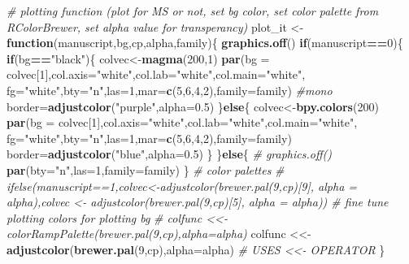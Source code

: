 \documentclass[10,portrait]{article}
\newenvironment{Shaded}{\begin{snugshade}}{\end{snugshade}}
\newcommand{\KeywordTok}[1]{\textcolor[rgb]{0.13,0.29,0.53}{\textbf{#1}}}
\newcommand{\DataTypeTok}[1]{\textcolor[rgb]{0.13,0.29,0.53}{#1}}
\newcommand{\DecValTok}[1]{\textcolor[rgb]{0.00,0.00,0.81}{#1}}
\newcommand{\FloatTok}[1]{\textcolor[rgb]{0.00,0.00,0.81}{#1}}
\newcommand{\StringTok}[1]{\textcolor[rgb]{0.31,0.60,0.02}{#1}}
\newcommand{\CommentTok}[1]{\textcolor[rgb]{0.56,0.35,0.01}{\textit{#1}}}
\newcommand{\ControlFlowTok}[1]{\textcolor[rgb]{0.13,0.29,0.53}{\textbf{#1}}}
\newcommand{\OperatorTok}[1]{\textcolor[rgb]{0.81,0.36,0.00}{\textbf{#1}}}
\newcommand{\NormalTok}[1]{#1}
\begin{document}
\begin{Shaded}
\begin{Highlighting}[]
\CommentTok{# plotting function (plot for MS or not, set bg color, set color palette from RColorBrewer, set alpha value for transperancy) }
\NormalTok{plot_it <-}\StringTok{ }\ControlFlowTok{function}\NormalTok{(manuscript,bg,cp,alpha,family)\{ }
  \KeywordTok{graphics.off}\NormalTok{()}
  \ControlFlowTok{if}\NormalTok{(manuscript}\OperatorTok{==}\DecValTok{0}\NormalTok{)\{}
    \ControlFlowTok{if}\NormalTok{(bg}\OperatorTok{==}\StringTok{"black"}\NormalTok{)\{}
\NormalTok{      colvec<-}\KeywordTok{magma}\NormalTok{(}\DecValTok{200}\NormalTok{,}\DecValTok{1}\NormalTok{)}
      \KeywordTok{par}\NormalTok{(}\DataTypeTok{bg =}\NormalTok{ colvec[}\DecValTok{1}\NormalTok{],}\DataTypeTok{col.axis=}\StringTok{"white"}\NormalTok{,}\DataTypeTok{col.lab=}\StringTok{"white"}\NormalTok{,}\DataTypeTok{col.main=}\StringTok{"white"}\NormalTok{,}
          \DataTypeTok{fg=}\StringTok{"white"}\NormalTok{,}\DataTypeTok{bty=}\StringTok{"n"}\NormalTok{,}\DataTypeTok{las=}\DecValTok{1}\NormalTok{,}\DataTypeTok{mar=}\KeywordTok{c}\NormalTok{(}\DecValTok{5}\NormalTok{,}\DecValTok{6}\NormalTok{,}\DecValTok{4}\NormalTok{,}\DecValTok{2}\NormalTok{),}\DataTypeTok{family=}\NormalTok{family) }\CommentTok{#mono}
\NormalTok{      border=}\KeywordTok{adjustcolor}\NormalTok{(}\StringTok{"purple"}\NormalTok{,}\DataTypeTok{alpha=}\FloatTok{0.5}\NormalTok{)}
\NormalTok{    \}}\ControlFlowTok{else}\NormalTok{\{}
\NormalTok{      colvec<-}\KeywordTok{bpy.colors}\NormalTok{(}\DecValTok{200}\NormalTok{)}
      \KeywordTok{par}\NormalTok{(}\DataTypeTok{bg =}\NormalTok{ colvec[}\DecValTok{1}\NormalTok{],}\DataTypeTok{col.axis=}\StringTok{"white"}\NormalTok{,}\DataTypeTok{col.lab=}\StringTok{"white"}\NormalTok{,}\DataTypeTok{col.main=}\StringTok{"white"}\NormalTok{,}
          \DataTypeTok{fg=}\StringTok{"white"}\NormalTok{,}\DataTypeTok{bty=}\StringTok{"n"}\NormalTok{,}\DataTypeTok{las=}\DecValTok{1}\NormalTok{,}\DataTypeTok{mar=}\KeywordTok{c}\NormalTok{(}\DecValTok{5}\NormalTok{,}\DecValTok{6}\NormalTok{,}\DecValTok{4}\NormalTok{,}\DecValTok{2}\NormalTok{),}\DataTypeTok{family=}\NormalTok{family) }
\NormalTok{      border=}\KeywordTok{adjustcolor}\NormalTok{(}\StringTok{"blue"}\NormalTok{,}\DataTypeTok{alpha=}\FloatTok{0.5}\NormalTok{)}
\NormalTok{    \}}
\NormalTok{  \}}\ControlFlowTok{else}\NormalTok{\{}
\CommentTok{#    graphics.off()}
    \KeywordTok{par}\NormalTok{(}\DataTypeTok{bty=}\StringTok{"n"}\NormalTok{,}\DataTypeTok{las=}\DecValTok{1}\NormalTok{,}\DataTypeTok{family=}\NormalTok{family) }
\NormalTok{  \}}
  \CommentTok{# color palettes}
  \CommentTok{# ifelse(manuscript==1,colvec<-adjustcolor(brewer.pal(9,cp)[9], alpha = alpha),colvec <- adjustcolor(brewer.pal(9,cp)[5], alpha = alpha)) # fine tune plotting colors for plotting bg}
   \CommentTok{# colfunc <<- colorRampPalette(brewer.pal(9,cp),alpha=alpha)}
\NormalTok{  colfunc <<-}\StringTok{ }\KeywordTok{adjustcolor}\NormalTok{(}\KeywordTok{brewer.pal}\NormalTok{(}\DecValTok{9}\NormalTok{,cp),}\DataTypeTok{alpha=}\NormalTok{alpha) }\CommentTok{# USES <<- OPERATOR}
\NormalTok{\}}
\end{Highlighting}
\end{Shaded}
\end{document}
